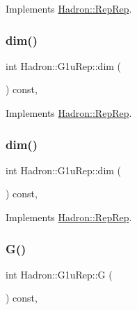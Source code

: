 Implements \mbox{\hyperlink{structHadron_1_1RepRep_a92c8802e5ed7afd7da43ccfd5b7cd92b}{Hadron\+::\+Rep\+Rep}}.

\mbox{\label{structHadron_1_1G1uRep_a13d30ff40203d77d9beacee3e48dbbd7}} 
\subsubsection{\texorpdfstring{dim()}{dim()}\hspace{0.1cm}{\footnotesize\ttfamily [4/5]}}
{\footnotesize\ttfamily int Hadron\+::\+G1u\+Rep\+::dim (\begin{DoxyParamCaption}{ }\end{DoxyParamCaption}) const\hspace{0.3cm}{\ttfamily [inline]}, {\ttfamily [virtual]}}



Implements \mbox{\hyperlink{structHadron_1_1RepRep_a92c8802e5ed7afd7da43ccfd5b7cd92b}{Hadron\+::\+Rep\+Rep}}.

\mbox{\label{structHadron_1_1G1uRep_a13d30ff40203d77d9beacee3e48dbbd7}} 
\subsubsection{\texorpdfstring{dim()}{dim()}\hspace{0.1cm}{\footnotesize\ttfamily [5/5]}}
{\footnotesize\ttfamily int Hadron\+::\+G1u\+Rep\+::dim (\begin{DoxyParamCaption}{ }\end{DoxyParamCaption}) const\hspace{0.3cm}{\ttfamily [inline]}, {\ttfamily [virtual]}}



Implements \mbox{\hyperlink{structHadron_1_1RepRep_a92c8802e5ed7afd7da43ccfd5b7cd92b}{Hadron\+::\+Rep\+Rep}}.

\mbox{\label{structHadron_1_1G1uRep_a458d6b9eaf24491739d751fb9227a27e}} 
\subsubsection{\texorpdfstring{G()}{G()}\hspace{0.1cm}{\footnotesize\ttfamily [1/3]}}
{\footnotesize\ttfamily int Hadron\+::\+G1u\+Rep\+::G (\begin{DoxyParamCaption}{ }\end{DoxyParamCaption}) const\hspace{0.3cm}{\ttfamily [inline]}, {\ttfamily [virtual]}}

